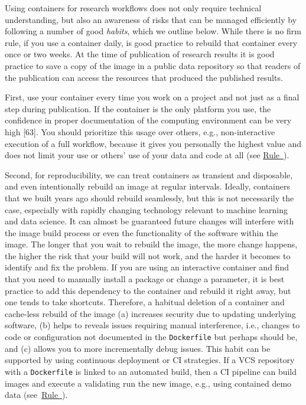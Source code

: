 \documentclass[10pt,letterpaper]{article}
\begin{document}
  \label{rule:usage} 

Using containers for research workflows does not only require technical
understanding, but also an awareness of risks that can be managed
efficiently by following a number of good \emph{habits}, which we
outline below. While there is no firm rule, if you use a container
daily, is good practice to rebuild that container every once or two
weeks. At the time of publication of research results it is good
practice to save a copy of the image in a public data repository so that
readers of the publication can access the resources that produced the
published results.

First, use your container every time you work on a project and not just
as a final step during publication. If the container is the only
platform you use, the confidence in proper documentation of the
computing environment can be very high {[}63{]}. You should prioritize
this usage over others, e.g., non-interactive execution of a full
workflow, because it gives you personally the highest value and does not
limit your use or others' use of your data and code at all (see
\hyperref[{rule:interactive}]{Rule~}).

Second, for reproducibility, we can treat containers as transient and
disposable, and even intentionally rebuild an image at regular
intervals. Ideally, containers that we built years ago should rebuild
seamlessly, but this is not necessarily the case, especially with
rapidly changing technology relevant to machine learning and data
science. It can almost be guaranteed future changes will interfere with
the image build process or even the functionality of the software within
the image. The longer that you wait to rebuild the image, the more
change happens, the higher the risk that your build will not work, and
the harder it becomes to identify and fix the problem. If you are using
an interactive container and find that you need to manually install a
package or change a parameter, it is best practice to add this
dependency to the container and rebuild it right away, but one tends to
take shortcuts. Therefore, a habitual deletion of a container and
cache-less rebuild of the image (a) increases security due to updating
underlying software, (b) helps to reveals issues requiring manual
interference, i.e., changes to code or configuration not documented in
the \texttt{Dockerfile} but perhaps should be, and (c) allows you to
more incrementally debug issues. This habit can be supported by using
continuous deployment or CI strategies. If a VCS repository with a
\texttt{Dockerfile} is linked to an automated build, then a CI pipeline
can build images and execute a validating run the new image, e.g., using
contained demo data
(see~\hyperref[{rule:mount}]{Rule~}).
\end{document}
